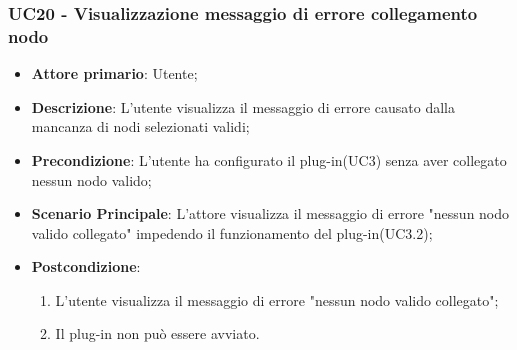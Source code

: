 \subsubsection{UC20 - Visualizzazione messaggio di errore collegamento nodo}
\label{sssec:uc20}
\begin{itemize}
  \item \textbf{Attore primario}: Utente;
  \item \textbf{Descrizione}: L'utente visualizza il messaggio di errore causato dalla mancanza di nodi selezionati validi;
  \item \textbf{Precondizione}: L'utente ha configurato il plug-in(UC3) senza aver collegato nessun nodo valido;
  \item \textbf{Scenario Principale}: L'attore visualizza il messaggio di errore "nessun nodo valido collegato" impedendo il funzionamento del plug-in(UC3.2);
  \item \textbf{Postcondizione}:
  \begin{enumerate}
		\item L'utente visualizza il messaggio di errore "nessun nodo valido collegato";
		\item Il plug-in non può essere avviato.
	\end{enumerate}
\end{itemize}

